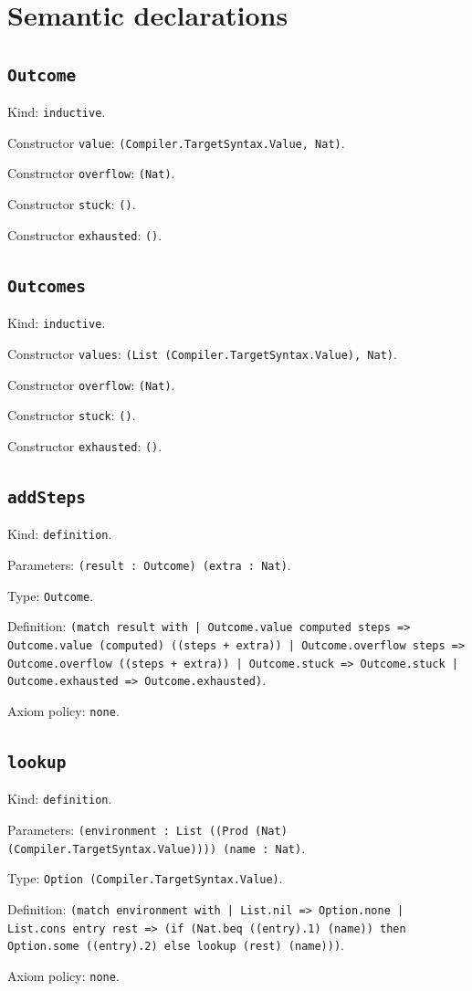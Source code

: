 \documentclass[11pt]{article}
\begin{document}
\section*{Semantic declarations}
\subsection*{\texttt{Outcome}}
\noindent Kind: \texttt{inductive}.\par
\noindent Constructor \texttt{value}: \texttt{(Compiler.TargetSyntax.Value, Nat)}.\par
\noindent Constructor \texttt{overflow}: \texttt{(Nat)}.\par
\noindent Constructor \texttt{stuck}: \texttt{()}.\par
\noindent Constructor \texttt{exhausted}: \texttt{()}.\par
\subsection*{\texttt{Outcomes}}
\noindent Kind: \texttt{inductive}.\par
\noindent Constructor \texttt{values}: \texttt{(List (Compiler.TargetSyntax.Value), Nat)}.\par
\noindent Constructor \texttt{overflow}: \texttt{(Nat)}.\par
\noindent Constructor \texttt{stuck}: \texttt{()}.\par
\noindent Constructor \texttt{exhausted}: \texttt{()}.\par
\subsection*{\texttt{addSteps}}
\noindent Kind: \texttt{definition}.\par
\noindent Parameters: \texttt{(result : Outcome) (extra : Nat)}.\par
\noindent Type: \texttt{Outcome}.\par
\noindent Definition: \texttt{(match result with | Outcome.value computed steps => Outcome.value (computed) ((steps + extra)) | Outcome.overflow steps => Outcome.overflow ((steps + extra)) | Outcome.stuck => Outcome.stuck | Outcome.exhausted => Outcome.exhausted)}.\par
\noindent Axiom policy: \texttt{none}.\par
\subsection*{\texttt{lookup}}
\noindent Kind: \texttt{definition}.\par
\noindent Parameters: \texttt{(environment : List ((Prod (Nat) (Compiler.TargetSyntax.Value)))) (name : Nat)}.\par
\noindent Type: \texttt{Option (Compiler.TargetSyntax.Value)}.\par
\noindent Definition: \texttt{(match environment with | List.nil => Option.none | List.cons entry rest => (if (Nat.beq ((entry).1) (name)) then Option.some ((entry).2) else lookup (rest) (name)))}.\par
\noindent Axiom policy: \texttt{none}.\par
\end{document}
